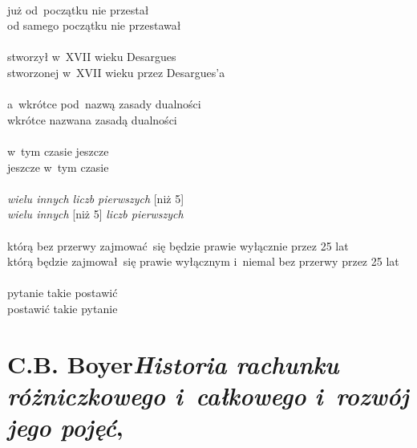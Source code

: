 \documentclass[a4paper,11pt]{article}
\numberwithin{equation}{section}
\begin{document}
\VerSpaceTwo


\noindent
{} \\
\Jest już od~początku nie przestał  \\
\PowinnoByc od samego początku nie przestawał \\
 \\
\Jest stworzył w~XVII wieku Desargues \\
\PowinnoByc stworzonej w~XVII wieku przez Desargues'a \\
 \\
\Jest a~wkrótce pod~nazwą zasady dualności \\
\PowinnoByc wkrótce nazwana zasadą dualności \\
 \\
\Jest w~tym czasie jeszcze \\
\PowinnoByc jeszcze w~tym czasie \\
 \\
\Jest \textit{wielu innych liczb pierwszych} [niż 5] \\
\PowinnoByc \textit{wielu innych} [niż 5] \textit{liczb pierwszych} \\
 \\
\Jest którą bez przerwy zajmować~się będzie prawie wyłącznie przez 25 lat \\
\PowinnoByc którą będzie zajmował~się prawie wyłącznym i~niemal bez przerwy
przez 25 lat \\
 \\
\Jest pytanie takie postawić \\
\PowinnoByc postawić takie pytanie \\












\newpage

\section{C.B. Boyer\textit{Historia rachunku różniczkowego
    i~całkowego} \textit{i~rozwój jego pojęć},
  \cite{BoyerHistoriaRachunkuRozniczkowegoICalkowego1964}}

\vspace{0em}
\end{document}
